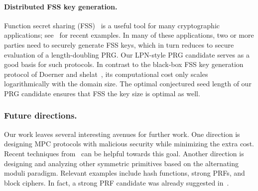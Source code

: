 \paragraph{Distributed FSS key generation.} Function secret sharing (FSS)~\cite{BGI15} is a useful tool for many cryptographic applications; see~\cite{BoyleMixedMode21,BoylePCGCrypto20} for recent examples. In many of these applications, two or more parties need to securely generate FSS keys, which in turn reduces to secure evaluation of a length-doubling PRG. Our LPN-style PRG candidate serves as a good basis for such protocols. In contrast to the black-box FSS key generation protocol of Doerner and shelat~\cite{sD}, its computational cost only scales logarithmically with the domain size. The optimal conjectured seed length of our PRG candidate ensures that FSS the key size is optimal as well.


\subsubsection{Future directions.} Our work leaves several interesting avenues for further work. One direction is designing MPC protocols with malicious security while minimizing the extra cost. Recent techniques from~\cite{cite} can be helpful towards this goal. Another direction is designing and analyzing other symmetric primitives based on the alternating moduli paradigm. Relevant examples include hash functions, strong PRFs, and block ciphers.  In fact, a strong PRF candidate was already suggested in~\cite{boneh2018-darkmatter}. 


%
